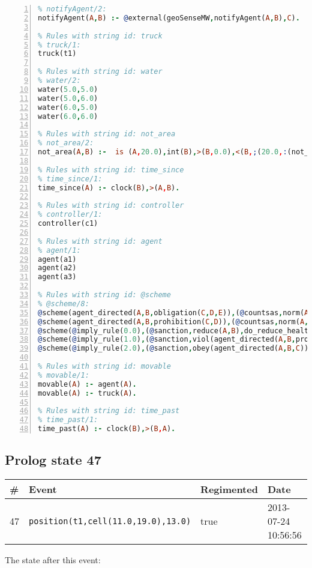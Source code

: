 \documentclass[11pt]{article}\usepackage[utf8]{inputenc}\usepackage{geometry}
\begin{document}
\begin{lstlisting}[language=Prolog, numbers=left]
% Rules with string id: notifyAgent
% notifyAgent/2:
notifyAgent(A,B) :- @external(geoSenseMW,notifyAgent(A,B),C).

% Rules with string id: truck
% truck/1:
truck(t1)

% Rules with string id: water
% water/2:
water(5.0,5.0)
water(5.0,6.0)
water(6.0,5.0)
water(6.0,6.0)

% Rules with string id: not_area
% not_area/2:
not_area(A,B) :-  is (A,20.0),int(B),>(B,0.0),<(B,;(20.0,:(not_area(A,B), is (-(B),20.0)))),int(A),>(A,0.0),<(A,;(20.0,:(area(A,B),-(int(A))))),int(B),>(A,0.0),>(B,0.0),<(A,21.0),<(B,21.0).

% Rules with string id: time_since
% time_since/1:
time_since(A) :- clock(B),>(A,B).

% Rules with string id: controller
% controller/1:
controller(c1)

% Rules with string id: agent
% agent/1:
agent(a1)
agent(a2)
agent(a3)

% Rules with string id: @scheme
% @scheme/8:
@scheme(agent_directed(A,B,obligation(C,D,E)),(@countsas,norm(A,B,F,obligation(C,D,E)),F),false,(listTrue(C)),(time_past(D)),false,[plus(viol(agent_directed(A,B,obligation(C,D,E))))|[]],[plus(obey(agent_directed(A,B,obligation(C,D,E))))|[]])
@scheme(agent_directed(A,B,prohibition(C,D)),(@countsas,norm(A,B,E,prohibition(C,D)),E),(listTrue(C)),false,(false),false,[plus(viol(agent_directed(A,B,prohibition(C,D))))|[]],[plus(obey(agent_directed(A,B,prohibition(C,D))))|[]])
@scheme(@imply_rule(0.0),(@sanction,reduce(A,B),do_reduce_health(A,B),notifyAgent(A,changed(status))),true,false,false,false,[min(reduce(A,B))|[]],[])
@scheme(@imply_rule(1.0),(@sanction,viol(agent_directed(A,B,prohibition(C,D))),do_sanction(D)),true,false,false,false,[min(viol(agent_directed(A,B,prohibition(C,D))))|[]],[])
@scheme(@imply_rule(2.0),(@sanction,obey(agent_directed(A,B,C))),true,false,false,false,[min(obey(agent_directed(A,B,C)))|[]],[])

% Rules with string id: movable
% movable/1:
movable(A) :- agent(A).
movable(A) :- truck(A).

% Rules with string id: time_past
% time_past/1:
time_past(A) :- clock(B),>(B,A).

\end{lstlisting}
\clearpage 
\subsection{Prolog state 47}
\begin{table}[ht]
\centering 
\begin{tabular}{l l l l} 
\textbf{\#} & \textbf{Event} & \textbf{Regimented} & \textbf{Date} \\ [0.5ex] 
\hline
47&\texttt{position(t1,cell(11.0,19.0),13.0)}&true&2013-07-24 10:56:56\\ [1ex] \hline\end{tabular}
\end{table}
The state after this event:
\end{document}
